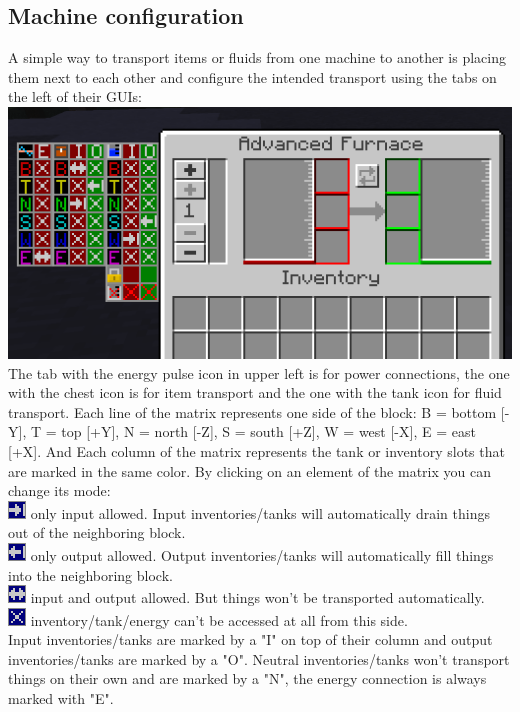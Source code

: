 \documentclass[11pt]{article} %
\begin{document}
\subsection{Machine configuration}
A simple way to transport items or fluids from one machine to another is placing them next to each other and configure the intended transport using the tabs on the left of their GUIs:\\
\includegraphics[width = \textwidth]{machineCfg}
The tab with the energy pulse icon in upper left is for power connections, the one with the chest icon is for item transport and the one with the tank icon for fluid transport. Each line of the matrix represents one side of the block: B = bottom [-Y], T = top [+Y], N = north [-Z], S = south [+Z], W = west [-X], E = east [+X]. And Each column of the matrix represents the tank or inventory slots that are marked in the same color. By clicking on an element of the matrix you can change its mode: \\
\includegraphics[]{cfgIn} only input allowed. Input inventories/tanks will automatically drain things out of the neighboring block. \\
\includegraphics[]{cfgOut} only output allowed. Output inventories/tanks will automatically fill things into the neighboring block. \\
\includegraphics[]{cfgBi} input and output allowed. But things won't be transported automatically. \\
\includegraphics[]{cfgNo} inventory/tank/energy can't be accessed at all from this side.\\
Input inventories/tanks are marked by a "I" on top of their column and output inventories/tanks are marked by a "O". Neutral inventories/tanks won't transport things on their own and are marked by a "N", the energy connection is always marked with "E".
\end{document}
